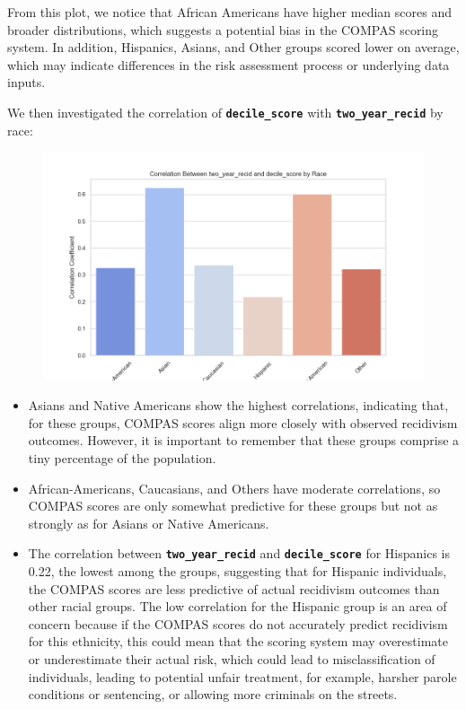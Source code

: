 From this plot, we notice that African Americans have higher median scores and broader distributions, which suggests a potential bias in the COMPAS scoring system. In addition, Hispanics, Asians, and Other groups scored lower on average, which may indicate differences in the risk assessment process or underlying data inputs.


We then investigated the correlation of \textbf{\texttt{decile\_score}} with \textbf{\texttt{two\_year\_recid}} by race:

\begin{figure}
	\centering
	\includegraphics[width=0.9\linewidth]{img/correlation_by_race}
	\caption{}
	\label{fig:correlationbyrace}
\end{figure}

\begin{itemize}
	\item Asians and Native Americans show the highest correlations, indicating that, for these groups, COMPAS scores align more closely with observed recidivism outcomes. However, it is important to remember that these groups comprise a tiny percentage of the population.
	
	\item African-Americans, Caucasians, and Others have moderate correlations, so COMPAS scores are only somewhat predictive for these groups but not as strongly as for Asians or Native Americans.
	
	\item The correlation between \textbf{\texttt{two\_year\_recid}} and \textbf{\texttt{decile\_score}} for Hispanics is 0.22, the lowest among the groups, suggesting that for Hispanic individuals, the COMPAS scores are less predictive of actual recidivism outcomes than other racial groups. The low correlation for the Hispanic group is an area of concern because if the COMPAS scores do not accurately predict recidivism for this ethnicity, this could mean that the scoring system may overestimate or underestimate their actual risk, which could lead to misclassification of individuals, leading to potential unfair treatment, for example, harsher parole conditions or sentencing, or allowing more criminals on the streets.
\end{itemize}

